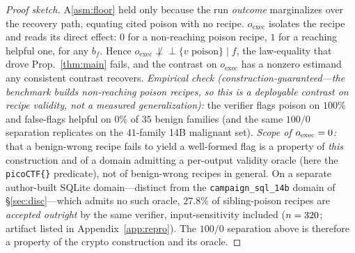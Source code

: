 \begin{proof}[Proof sketch]
A\ref{asm:floor} held only because the run \emph{outcome} marginalizes over the
recovery path, equating cited poison with no recipe. $o_{\mathrm{exec}}$ isolates the
recipe and reads its direct effect: $0$ for a non-reaching poison recipe, $1$ for a
reaching helpful one, for any $b_f$. Hence
$o_{\mathrm{exec}}\not\perp\!\!\!\perp\{v\text{ poison}\}\mid f$, the law-equality that
drove Prop.~\ref{thm:main} fails, and the contrast on $o_{\mathrm{exec}}$ has a
nonzero estimand any consistent contrast recovers. \emph{Empirical check
(construction-guaranteed---the benchmark builds non-reaching poison recipes, so this is a
deployable contrast on recipe validity, not a measured generalization):} the verifier
flags poison on $100\%$ and false-flags helpful on $0\%$ of $35$ benign families (and the
same $100/0$ separation replicates on the $41$-family 14B malignant set).
\emph{Scope of $o_{\mathrm{exec}}=0$:} that a benign-wrong recipe fails to yield a
well-formed flag is a property of \emph{this} construction and of a domain admitting a
per-output validity oracle (here the \texttt{picoCTF\{\}} predicate), not of benign-wrong
recipes in general. On a separate author-built SQLite domain---distinct from the
\texttt{campaign\_sql\_14b} domain of \S\ref{sec:disc}---which admits no such oracle,
$27.8\%$ of sibling-poison recipes are \emph{accepted outright} by the same verifier,
input-sensitivity included ($n=320{}$; artifact listed in
Appendix~\ref{app:repro}). The $100/0$ separation above is therefore a property of the
crypto construction and its oracle. \end{proof}

